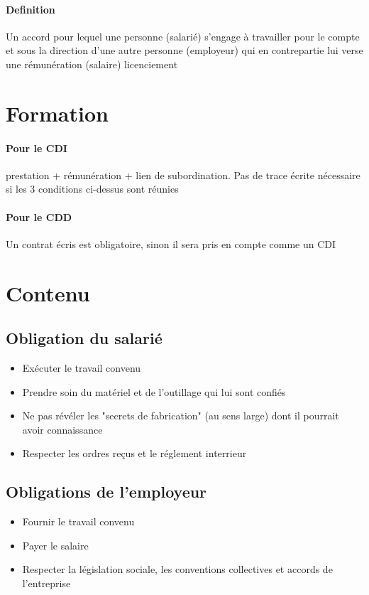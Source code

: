 \documentclass[12pt,a4paper,openany]{report}
\begin{document}
	\maketitle

	\paragraph{Definition} Un accord pour lequel une personne (salarié) s'engage à travailler pour le compte et sous la direction d'une autre personne (employeur) qui en contrepartie lui verse une rémunération (salaire)
licenciement 
	\section{Formation}
	\paragraph{Pour le CDI} prestation + rémunération + lien de subordination. 
	Pas de trace écrite nécessaire si les 3 conditions ci-dessus sont réunies

	\paragraph{Pour le CDD} Un contrat écris est obligatoire, sinon il sera pris en compte comme un CDI

	\section{Contenu}
	\subsection{ Obligation du salarié}
		\begin{itemize}
			\item Exécuter le travail convenu
			\item Prendre soin du matériel et de l'outillage qui lui sont confiés
			\item Ne pas révéler les "secrets de fabrication" (au sens large) dont il pourrait avoir connaissance
			\item Respecter les ordres reçus et le réglement interrieur
		\end{itemize}

		\subsection{Obligations de l'employeur}
		\begin{itemize}
			\item  Fournir le travail convenu
			\item  Payer le salaire
			\item  Respecter la législation sociale, les conventions collectives et accords de l'entreprise
		\end{itemize}
\end{document}
